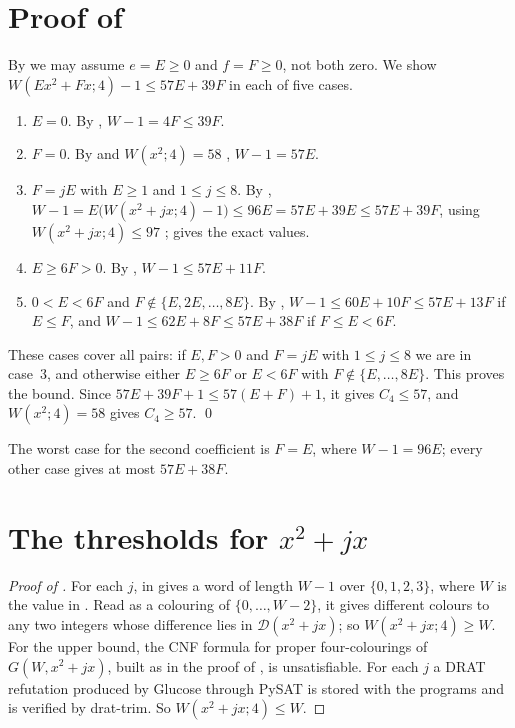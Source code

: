 \documentclass[11pt,colorlinks]{charlie}
\newcommand{\D}{\mathcal D}
\begin{document}
\section{Proof of \texorpdfstring{}{Theorem 1}}\label{sec:proof}

By  we may assume $e=E\ge0$ and $f=F\ge0$, not both zero. We show $W(Ex^2+Fx;4)-1\le57E+39F$ in each of five cases.
\begin{enumerate}
\item $E=0$. By , $W-1=4F\le39F$.
\item $F=0$. By  and $W(x^2;4)=58$ \cite{CCFGMS}, $W-1=57E$.
\item $F=jE$ with $E\ge1$ and $1\le j\le8$. By , $W-1=E\bigl(W(x^2+jx;4)-1\bigr)\le96E=57E+39E\le57E+39F$, using $W(x^2+jx;4)\le97$ \cite[Lemma~4.2]{KGRW};  gives the exact values.
\item $E\ge6F>0$. By , $W-1\le57E+11F$.
\item $0<E<6F$ and $F\notin\{E,2E,\dots,8E\}$. By , $W-1\le60E+10F\le57E+13F$ if $E\le F$, and $W-1\le62E+8F\le57E+38F$ if $F\le E<6F$.
\end{enumerate}
These cases cover all pairs: if $E,F>0$ and $F=jE$ with $1\le j\le8$ we are in case~3, and otherwise either $E\ge6F$ or $E<6F$ with $F\notin\{E,\dots,8E\}$. This proves the bound. Since $57E+39F+1\le57(E+F)+1$, it gives $C_4\le57$, and $W(x^2;4)=58$ gives $C_4\ge57$. \qed

The worst case for the second coefficient is $F=E$, where $W-1=96E$; every other case gives at most $57E+38F$.

\section{The thresholds for \texorpdfstring{$x^2+jx$}{x²+jx}}\label{sec:table}

\begin{proof}[Proof of ]
For each $j$,  in  gives a word of length $W-1$ over $\{0,1,2,3\}$, where $W$ is the value in . Read as a colouring of $\{0,\dots,W-2\}$, it gives different colours to any two integers whose difference lies in $\D(x^2+jx)$; so $W(x^2+jx;4)\ge W$. For the upper bound, the CNF formula for proper four-colourings of $G(W,x^2+jx)$, built as in the proof of , is unsatisfiable. For each $j$ a DRAT refutation produced by Glucose \cite{Glucose} through PySAT \cite{PySAT} is stored with the programs and is verified by drat-trim. So $W(x^2+jx;4)\le W$.
\end{proof}
\end{document}
